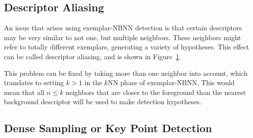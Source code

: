 
\subsection{Descriptor Aliasing} %
\label{sec:descriptor_aliasing}

An issue that arises using exemplar-NBNN detection is that certain descriptors may be very similar to not one, but multiple neighbors. These neighbors might refer to totally different exemplars, generating a variety of hypotheses. This effect can be called descriptor aliasing, and is shown in Figure~\ref{fig:aliasing}.

\begin{figure}[hbt]
    \centering
    \label{fig:aliasing}
\end{figure}

This problem can be fixed by taking more than one neighbor into account, which translates to setting $k>1$ in the $k$NN phase of exemplar-NBNN. This would mean that all $n\leq k$ neighbors that are closer to the foreground than the nearest background descriptor will be used to make detection hypotheses.


\subsection{Dense Sampling or Key Point Detection} %
\label{sec:dense_sampling_or_key_point_detection}




